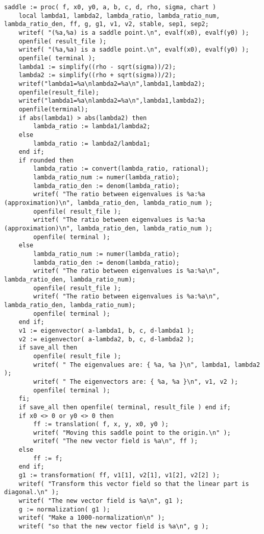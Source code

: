 \documentclass[a4paper,10pt]{article}
\begin{document}
\begin{lstlisting}[name=type]
saddle := proc( f, x0, y0, a, b, c, d, rho, sigma, chart )
    local lambda1, lambda2, lambda_ratio, lambda_ratio_num, lambda_ratio_den, ff, g, g1, v1, v2, stable, sep1, sep2;
    writef( "(%a,%a) is a saddle point.\n", evalf(x0), evalf(y0) );
    openfile( result_file );
    writef( "(%a,%a) is a saddle point.\n", evalf(x0), evalf(y0) );
    openfile( terminal );
    lambda1 := simplify((rho - sqrt(sigma))/2);
    lambda2 := simplify((rho + sqrt(sigma))/2);
    writef("lambda1=%a\nlambda2=%a\n",lambda1,lambda2);
    openfile(result_file);
    writef("lambda1=%a\nlambda2=%a\n",lambda1,lambda2);
    openfile(terminal);
    if abs(lambda1) > abs(lambda2) then
        lambda_ratio := lambda1/lambda2;
    else
        lambda_ratio := lambda2/lambda1;
    end if;
    if rounded then
        lambda_ratio := convert(lambda_ratio, rational);
        lambda_ratio_num := numer(lambda_ratio);
        lambda_ratio_den := denom(lambda_ratio);
        writef( "The ratio between eigenvalues is %a:%a (approximation)\n", lambda_ratio_den, lambda_ratio_num );
        openfile( result_file );
        writef( "The ratio between eigenvalues is %a:%a (approximation)\n", lambda_ratio_den, lambda_ratio_num );
        openfile( terminal );
    else
        lambda_ratio_num := numer(lambda_ratio);
        lambda_ratio_den := denom(lambda_ratio);
        writef( "The ratio between eigenvalues is %a:%a\n", lambda_ratio_den, lambda_ratio_num);
        openfile( result_file );
        writef( "The ratio between eigenvalues is %a:%a\n", lambda_ratio_den, lambda_ratio_num);
        openfile( terminal );
    end if;
    v1 := eigenvector( a-lambda1, b, c, d-lambda1 );
    v2 := eigenvector( a-lambda2, b, c, d-lambda2 );
    if save_all then
        openfile( result_file );
        writef( " The eigenvalues are: { %a, %a }\n", lambda1, lambda2 );
        writef( " The eigenvectors are: { %a, %a }\n", v1, v2 );
        openfile( terminal );
    fi;
    if save_all then openfile( terminal, result_file ) end if;
    if x0 <> 0 or y0 <> 0 then
        ff := translation( f, x, y, x0, y0 );
        writef( "Moving this saddle point to the origin.\n" );
        writef( "The new vector field is %a\n", ff );
    else
        ff := f;
    end if;
    g1 := transformation( ff, v1[1], v2[1], v1[2], v2[2] );
    writef( "Transform this vector field so that the linear part is diagonal.\n" );
    writef( "The new vector field is %a\n", g1 );
    g := normalization( g1 );
    writef( "Make a 1000-normalization\n" );
    writef( "so that the new vector field is %a\n", g );

\end{lstlisting}
\end{document}

